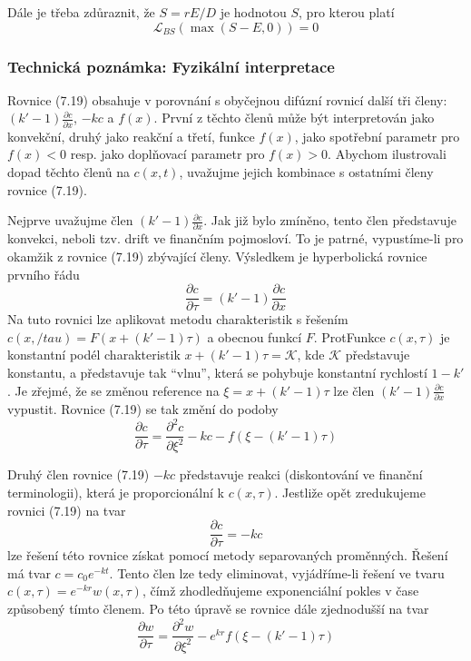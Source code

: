 \documentclass[a4paper]{book}
\begin{document}
Dále je třeba zdůraznit, že $S = rE/D$ je hodnotou $S$, pro kterou platí
\begin{equation*}
\mathcal{L}_{BS}(\max(S - E,0)) = 0
\end{equation*}

\subsubsection{Technická poznámka: Fyzikální interpretace}

Rovnice (7.19) obsahuje v porovnání s obyčejnou difúzní rovnicí další tři členy: $(k' - 1) \frac{\partial c}{\partial x}$, $-kc$ a $f(x)$. První z těchto členů může být interpretován jako konvekční, druhý jako reakční a třetí, funkce $f(x)$, jako spotřební parametr pro $f(x) < 0$ resp. jako doplňovací parametr pro $f(x) > 0$. Abychom ilustrovali dopad těchto členů na $c(x,t)$, uvažujme jejich kombinace s ostatními členy rovnice (7.19).

Nejprve uvažujme člen $(k' - 1) \frac{\partial c}{\partial x}$. Jak již bylo zmíněno, tento člen představuje konvekci, neboli tzv. drift ve finančním pojmosloví. To je patrné, vypustíme-li pro okamžik z rovnice (7.19) zbývající členy. Výsledkem je hyperbolická rovnice prvního řádu
\begin{equation*}
\frac{\partial c}{\partial \tau} = (k' - 1)\frac{\partial c}{\partial x}
\end{equation*}
Na tuto rovnici lze aplikovat metodu charakteristik s řešením $c(x, /tau) = F(x + (k' - 1)\tau)$ a obecnou funkcí $F$. ProtFunkce $c(x, \tau)$ je konstantní podél charakteristik $x + (k' - 1)\tau = \mathcal{K}$, kde $\mathcal{K}$ představuje konstantu, a představuje tak ``vlnu'', která se pohybuje konstantní rychlostí $1 - k'$. Je zřejmé, že se změnou reference na $\xi = x + (k' - 1)\tau$ lze člen $(k' - 1) \frac{\partial c}{\partial x}$ vypustit. Rovnice (7.19) se tak změní do podoby
\begin{equation*}
\frac{\partial c}{\partial \tau} = \frac{\partial^2 c}{\partial \xi^2} - kc -f(\xi - (k' - 1)\tau)
\end{equation*}

Druhý člen rovnice (7.19) $-kc$ představuje reakci (diskontování ve finanční terminologii), která je proporcionální k $c(x, \tau)$. Jestliže opět zredukujeme rovnici (7.19) na tvar
\begin{equation*}
\frac{\partial c}{\partial \tau} = -kc
\end{equation*}
lze řešení této rovnice získat pomocí metody separovaných proměnných. Řešení má tvar $c = c_0 e^{-kt}$. Tento člen lze tedy eliminovat, vyjádříme-li řešení ve tvaru $c(x, \tau) = e^{-kr}w(x, \tau)$, čímž zhodledňujeme exponenciální pokles v čase způsobený tímto členem. Po této úpravě se rovnice dále zjednodušší na tvar
\begin{equation*}
\frac{\partial w}{\partial \tau} = \frac{\partial^2 w}{\partial \xi^2} - e^{kr}f(\xi - (k' - 1)\tau)
\end{equation*}
\end{document}
